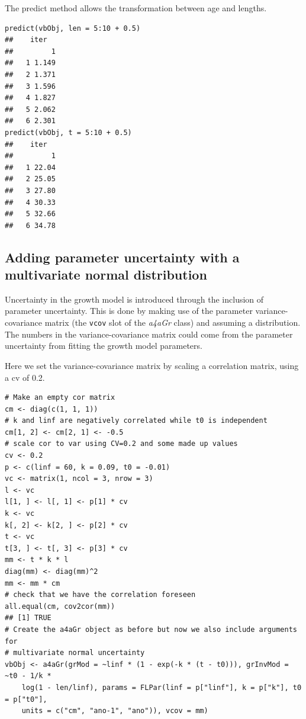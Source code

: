 \documentclass[a4paper,english,10pt]{article}\usepackage[]{graphicx}\usepackage[]{color}
\makeatletter
\newenvironment{kframe}{%
 \def\at@end@of@kframe{}%
 \ifinner\ifhmode%
  \def\at@end@of@kframe{\end{minipage}}%
  \begin{minipage}{\columnwidth}%
 \fi\fi%
 \def\FrameCommand##1{\hskip\@totalleftmargin \hskip-\fboxsep
 \colorbox{shadecolor}{##1}\hskip-\fboxsep
     \hskip-\linewidth \hskip-\@totalleftmargin \hskip\columnwidth}%
 \MakeFramed {\advance\hsize-\width
   \@totalleftmargin\z@ \linewidth\hsize
   \@setminipage}}%
 {\par\unskip\endMakeFramed%
 \at@end@of@kframe}
\newenvironment{knitrout}{}{} %
\newcommand{\code}[1]{{\texttt{#1}}}
\newcommand{\class}[1]{{\textit{#1}}}
\makeatother
\begin{document}
The predict method allows the transformation between age and lengths.

\begin{knitrout}
\color{fgcolor}\begin{kframe}
\begin{verbatim}
predict(vbObj, len = 5:10 + 0.5)
##    iter
##         1
##   1 1.149
##   2 1.371
##   3 1.596
##   4 1.827
##   5 2.062
##   6 2.301
predict(vbObj, t = 5:10 + 0.5)
##    iter
##         1
##   1 22.04
##   2 25.05
##   3 27.80
##   4 30.33
##   5 32.66
##   6 34.78
\end{verbatim}
\end{kframe}
\end{knitrout}


\subsection{Adding parameter uncertainty with a multivariate normal distribution}

Uncertainty in the growth model is introduced through the inclusion of parameter uncertainty.
This is done by making use of the parameter variance-covariance matrix (the \code{vcov} slot of the \class{a4aGr} class) and assuming a distribution. The numbers in the variance-covariance matrix could come from the parameter uncertainty from fitting the growth model parameters.

Here we set the variance-covariance matrix by scaling a correlation matrix, using a cv of 0.2.

\begin{knitrout}
\color{fgcolor}\begin{kframe}
\begin{verbatim}
# Make an empty cor matrix
cm <- diag(c(1, 1, 1))
# k and linf are negatively correlated while t0 is independent
cm[1, 2] <- cm[2, 1] <- -0.5
# scale cor to var using CV=0.2 and some made up values
cv <- 0.2
p <- c(linf = 60, k = 0.09, t0 = -0.01)
vc <- matrix(1, ncol = 3, nrow = 3)
l <- vc
l[1, ] <- l[, 1] <- p[1] * cv
k <- vc
k[, 2] <- k[2, ] <- p[2] * cv
t <- vc
t[3, ] <- t[, 3] <- p[3] * cv
mm <- t * k * l
diag(mm) <- diag(mm)^2
mm <- mm * cm
# check that we have the correlation foreseen
all.equal(cm, cov2cor(mm))
## [1] TRUE
# Create the a4aGr object as before but now we also include arguments for
# multivariate normal uncertainty
vbObj <- a4aGr(grMod = ~linf * (1 - exp(-k * (t - t0))), grInvMod = ~t0 - 1/k * 
    log(1 - len/linf), params = FLPar(linf = p["linf"], k = p["k"], t0 = p["t0"], 
    units = c("cm", "ano-1", "ano")), vcov = mm)
\end{verbatim}
\end{kframe}
\end{knitrout}
\end{document}
